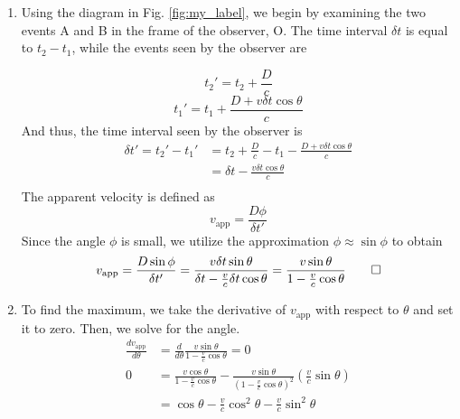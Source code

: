 \documentclass{article}
\begin{document}
\begin{enumerate}[label=\alph*.]
    \item Using the diagram in Fig. \ref{fig:my_label}, we begin by examining the two events A and B in the frame of the observer, O. The time interval $\delta t$ is equal to $t_2 - t_1$, while the events seen by the observer are
    
    \begin{equation}
        t_2' = t_2 + \frac{D}{c}
    \end{equation}
    \begin{equation}
        t_1' = t_1 + \frac{D + v\delta t \cos \theta}{c}
    \end{equation}
    And thus, the time interval seen by the observer is
    \begin{equation}
        \begin{split}
            \delta t' = t_2' - t_1' &= t_2 + \frac{D}{c} - t_1 - \frac{D + v\delta t \cos \theta}{c}\\
            &=  \delta t - \frac{v\delta t \cos \theta}{c}\\
        \end{split}
    \end{equation}
    The apparent velocity is defined as 
    \begin{equation}
        v_{\textrm{app}} = \frac{D\phi}{\delta t'}
    \end{equation}
    Since the angle $\phi$ is small, we utilize the approximation $\phi \approx \sin \phi$ to obtain
    \begin{equation}
        v_{\textrm{app}} = \frac{D\sin \phi}{\delta t'} = \frac{v \delta t \sin \theta}{\delta t - \frac{v}{c}\delta t \cos \theta} = \frac{v\sin \theta}{1 - \frac{v}{c} \cos \theta} \qed
    \end{equation}
    \item To find the maximum,  we take the derivative of $v_{\textrm{app}}$ with respect to $\theta$ and set it to zero. Then, we solve for the angle. 
    \begin{equation}
        \begin{split}
            \frac{dv_{\textrm{app}}}{d\theta} &= \frac{d}{d\theta} \frac{v\sin \theta}{1 - \frac{v}{c} \cos \theta} = 0\\
            0 &= \frac{v\cos\theta}{1 - \frac{v}{c}\cos \theta} - \frac{v\sin\theta}{\left(1 - \frac{v}{c}\cos\theta\right)^2}\left(\frac{v}{c}\sin\theta\right)\\
            & = \cos\theta -\frac{v}{c}\cos^2\theta  - \frac{v}{c}\sin^2\theta

\end{split}
\end{equation}
\end{enumerate}
\end{document}
